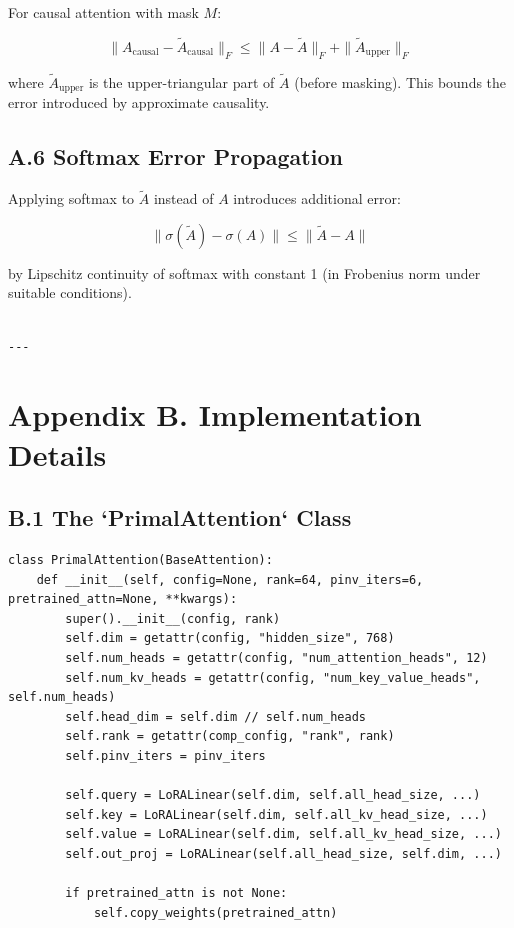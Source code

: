 For causal attention with mask $M$:

\[
\|A_\text{causal} - \tilde{A}_\text{causal}\|_F \leq \|A - \tilde{A}\|_F + \|\tilde{A}_\text{upper}\|_F
\]

where $\tilde{A}_\text{upper}$ is the upper-triangular part of $\tilde{A}$ 
(before masking). This bounds the error introduced by approximate causality.

\subsection{A.6 Softmax Error Propagation}

Applying softmax to $\tilde{A}$ instead of $A$ introduces additional error:

\[
\|\sigma(\tilde{A}) - \sigma(A)\| \le \|\tilde{A} - A\|
\]

by Lipschitz continuity of softmax with constant 1 (in Frobenius norm under 
suitable conditions).
\begin{lstlisting}

---
\end{lstlisting}


\section{Appendix B. Implementation Details}

\subsection{B.1 The `PrimalAttention` Class}

\begin{lstlisting}
class PrimalAttention(BaseAttention):
    def __init__(self, config=None, rank=64, pinv_iters=6, pretrained_attn=None, **kwargs):
        super().__init__(config, rank)
        self.dim = getattr(config, "hidden_size", 768)
        self.num_heads = getattr(config, "num_attention_heads", 12)
        self.num_kv_heads = getattr(config, "num_key_value_heads", self.num_heads)
        self.head_dim = self.dim // self.num_heads
        self.rank = getattr(comp_config, "rank", rank)
        self.pinv_iters = pinv_iters
        
        self.query = LoRALinear(self.dim, self.all_head_size, ...)
        self.key = LoRALinear(self.dim, self.all_kv_head_size, ...)
        self.value = LoRALinear(self.dim, self.all_kv_head_size, ...)
        self.out_proj = LoRALinear(self.all_head_size, self.dim, ...)
        
        if pretrained_attn is not None:
            self.copy_weights(pretrained_attn)
\end{lstlisting}

